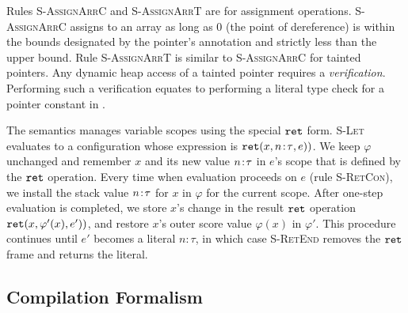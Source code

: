 Rules \textsc{S-AssignArrC} and \textsc{S-AssignArrT} are for assignment operations.
\textsc{S-AssignArrC} assigns to an array as long as 0 (the point of
dereference) is within the bounds designated by the pointer's annotation
and strictly less than the upper bound. 
Rule \textsc{S-AssignArrT} is similar to \textsc{S-AssignArrC} for tainted pointers.
Any dynamic heap access of a tainted pointer requires a \textit{verification}.
Performing such a verification equates to performing a literal type check for a pointer constant in .

%
The semantics manages variable scopes using the special $\mathtt{ret}$
form. \textsc{S-Let} evaluates to a configuration whose expression is
$\mathtt{ret}({x},{{n}\!:\!{\tau}},{e}))$. We keep $\varphi$ unchanged
and remember $x$ and its new value ${n}\!:\!{\tau}$
in $e$'s scope that is defined by the $\mathtt{ret}$ operation.
Every time when evaluation proceeds on $e$ (rule \textsc{S-RetCon}),
we install the stack value ${n}\!:\!{\tau}$ for $x$ in $\varphi$ for the current scope.
After one-step evaluation is completed, 
we store $x$'s change in the result $\mathtt{ret}$ operation $\mathtt{ret}({x},{\varphi'(x)},{e'}))$,
and restore $x$'s outer score value $\varphi(x)$ in $\varphi'$. 
This procedure continues until $e'$ becomes a literal
$n\!:\!\tau$, in which case \textsc{S-RetEnd} removes the $\mathtt{ret}$ frame and returns
the literal. 

\subsection{Compilation Formalism}\label{appx:comp1}

